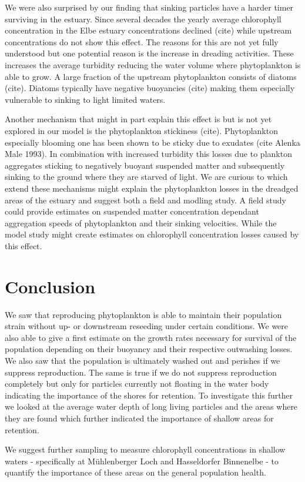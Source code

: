We were also surprised by our finding that sinking particles have a harder timer surviving in the estuary. 
Since several decades the yearly average chlorophyll concentration in the Elbe estuary concentrations declined (cite) while upstream concentrations do not show this effect.
The reasons for this are not yet fully understood but one potential reason is the increase in dreading activities.
These increases the average turbidity reducing the water volume where phytoplankton is able to grow.
A large fraction of the upstream phytoplankton consists of diatoms (cite).
Diatoms typically have negative buoyancies (cite) making them especially vulnerable to sinking to light limited waters.

Another mechanism that might in part explain this effect is but is not yet explored in our model is the phytoplankton stickiness (cite). 
Phytoplankton especially blooming one has been shown to be sticky due to exudates (cite Alenka Male 1993).
In combination with increased turbidity this losses due to plankton aggregates sticking to negatively buoyant suspended matter and subsequently sinking to the ground where they are starved of light.
We are curious to which extend these mechanisms might explain the phytoplankton losses in the dreadged areas of the estuary and suggest both a field and modling study. A field study could provide estimates on suspended matter concentration dependant aggregation speeds of phytoplankton and their sinking velocities. While the model study might create estimates on chlorophyll concentration losses caused by this effect.


\section*{Conclusion}

We saw that reproducing phytoplankton is able to maintain their population strain without up- or downstream reseeding under certain conditions.
We were also able to give a first estimate on the growth rates necessary for survival of the population depending on their buoyancy and their respective outwashing losses.
We also saw that the population is ultimately washed out and perishes if we suppress reproduction.
The same is true if we do not suppress reproduction completely but only for particles currently not floating in the water body indicating the importance of the shores for retention.
To investigate this further we looked at the average water depth of long living particles and the areas where they are found which further indicated the importance of shallow areas for retention.

We suggest further sampling to measure chlorophyll concentrations in shallow waters - specifically at Mühlenberger Loch and Hasseldorfer Binnenelbe - to quantify the importance of these areas on the general population health.
                


